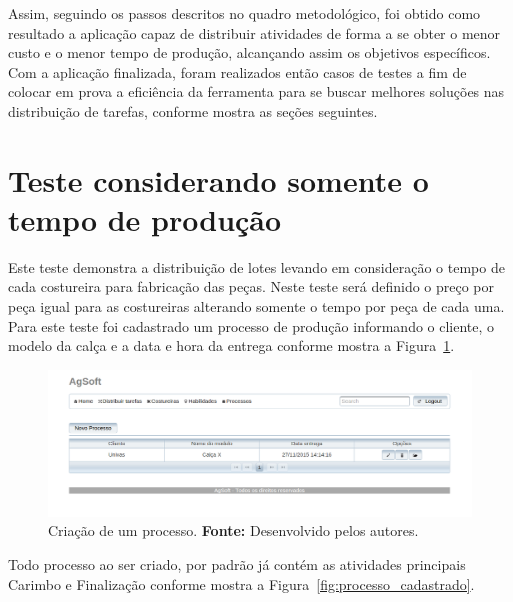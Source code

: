 \par Assim, seguindo os passos descritos no quadro metodológico, foi obtido como resultado a aplicação
capaz de distribuir atividades de forma a se obter o menor custo e o menor tempo de produção, 
alcançando assim os objetivos específicos. Com a aplicação finalizada, foram realizados então casos de 
testes a fim de colocar em prova a eficiência da ferramenta para se buscar melhores soluções nas distribuição 
de tarefas, conforme mostra as seções seguintes.


\section{Teste considerando somente o tempo de produção}

\par Este teste demonstra a distribuição de lotes levando em consideração o
tempo de cada costureira para fabricação das peças. Neste teste será definido o
preço por peça igual para as costureiras alterando somente o tempo por peça de
cada uma. Para este teste foi cadastrado um processo de produção informando o
cliente, o modelo da calça e a data e hora da entrega conforme mostra a Figura~\ref{fig:cad_processo1}.

\begin{figure}[h!]
	\centerline{\includegraphics[scale=0.4]{./imagens/teste_processo.png}}
	\caption[Criação de um processo.]
	{Criação de um processo. \textbf{Fonte:} Desenvolvido pelos autores.}
	\label{fig:cad_processo1}
\end{figure}

\par Todo processo ao ser criado, por padrão já contém as atividades principais
 Carimbo e Finalização conforme mostra a Figura~\ref{fig:processo_cadastrado}.

